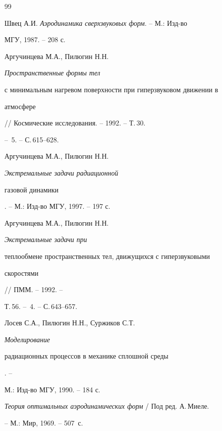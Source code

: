 \begin{thebibliography}{99}







Швец А.И. {\it Аэродинамика сверхзвуковых форм}. -- М.: Изд-во


МГУ, 1987. -- 208 с.




Аргучинцева М.А., Пилюгин Н.Н. {\it Пространственные формы тел


с минимальным нагревом поверхности при гиперзвуковом движении в


атмосфере} // Космические исследования. -- 1992. -- Т.\,30.


-- \No\,5. -- С.\,615--628.




Аргучинцева М.А., Пилюгин Н.Н. {\it Экстремальные задачи радиационной


газовой динамики}. -- М.: Изд-во МГУ, 1997. -- 197 с.




Аргучинцева М.А., Пилюгин Н.Н. {\it Экстремальные задачи при


теплообмене пространственных тел, движущихся с гиперзвуковыми


скоростями} // ПММ. -- 1992. --


Т.\,56. -- \No\,4. -- С.\,643--657.




Лосев С.А., Пилюгин Н.Н., Суржиков С.Т. {\it Моделирование


радиационных процессов в механике сплошной среды}. --


М.: Изд-во МГУ, 1990. -- 184 с.




{\it Теория оптимальных аэродинамических форм} / Под ред. А.\,Миеле.


-- М.: Мир, 1969. -- 507~с.





\end{thebibliography}





\vskip 2cm












\label{end}





